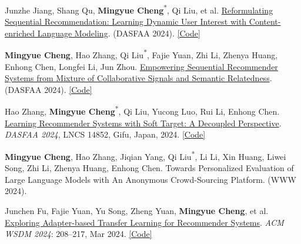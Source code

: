 \documentclass[UTF8,fontset=fandol,scheme=plain,11pt,a4paper]{ctexart}
\newcommand{\pubentry}[1]{\item \begin{minipage}[t]{\linewidth}#1\end{minipage}}
\begin{document}
\begin{publist}[start=43]
\pubentry{Junzhe Jiang, Shang Qu, \textbf{Mingyue Cheng}\textsuperscript{*}, Qi Liu, et al. \href{https://arxiv.org/pdf/2309.10435}{Reformulating Sequential Recommendation: Learning Dynamic User Interest with Content-enriched Language Modeling}. (DASFAA 2024). \href{https://github.com/Gnimixy/lancer}{[Code]}}

\pubentry{\textbf{Mingyue Cheng}, Hao Zhang, Qi Liu\textsuperscript{*}, Fajie Yuan, Zhi Li, Zhenya Huang, Enhong Chen, Longfei Li, Jun Zhou. \href{https://arxiv.org/pdf/2403.07623}{Empowering Sequential Recommender Systems from Mixture of Collaborative Signals and Semantic Relatedness}. (DASFAA 2024). \href{https://github.com/Mingyue-Cheng/TSSR}{[Code]}}

\pubentry{Hao Zhang, \textbf{Mingyue Cheng}\textsuperscript{*}, Qi Liu, Yucong Luo, Rui Li, Enhong Chen. \href{https://arxiv.org/pdf/2410.06536}{Learning Recommender Systems with Soft Target: A Decoupled Perspective}. \emph{DASFAA 2024}, LNCS 14852, Gifu, Japan, 2024. \href{https://github.com/zh-ustc/desorec/}{[Code]}}

\pubentry{\textbf{Mingyue Cheng}, Hao Zhang, Jiqian Yang, Qi Liu\textsuperscript{*}, Li Li, Xin Huang, Liwei Song, Zhi Li, Zhenya Huang, Enhong Chen. Towards Personalized Evaluation of Large Language Models with An Anonymous Crowd-Sourcing Platform. (WWW 2024).}

\pubentry{Junchen Fu, Fajie Yuan, Yu Song, Zheng Yuan, \textbf{Mingyue Cheng}, et al. \href{https://arxiv.org/pdf/2305.15036}{Exploring Adapter-based Transfer Learning for Recommender Systems}. \emph{ACM WSDM 2024}: 208--217, Mar 2024. \href{https://github.com/westlake-repl/Adapter4Rec/}{[Code]}}

\end{publist}

\end{document}
